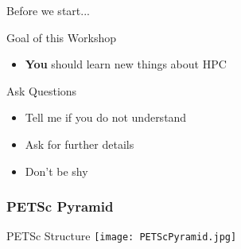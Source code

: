 








\begin{frame}{Before we start...}

   \begin{block}{Goal of this Workshop}
    \begin{itemize}
     \item {\Huge \textbf{\color{red} You}} should learn new things about HPC
    \end{itemize}
   \end{block}

   \vspace*{1cm}
   \begin{block}{Ask Questions}
    \begin{itemize}
     \item Tell me if you do not understand
     \item Ask for further details
     \item Don't be shy
    \end{itemize}
   \end{block}

\end{frame}





%
%












\begin{frame}[fragile]
\frametitle{PETSc Pyramid}
 \begin{block}{PETSc Structure} \vspace{0.3cm}
   \texttt{[image: PETScPyramid.jpg]}
 \end{block}

\end{frame}

